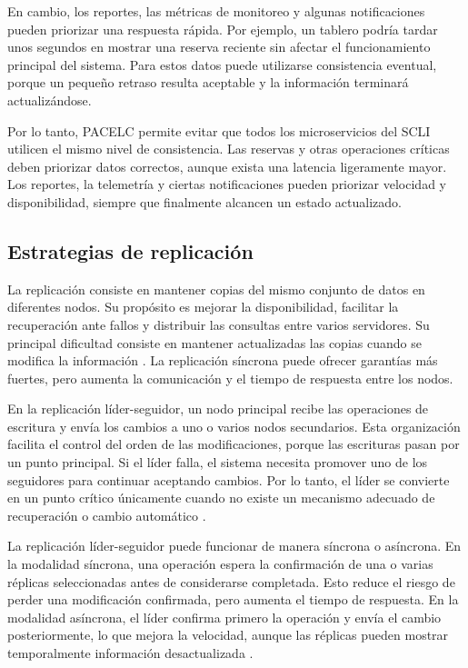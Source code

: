 \documentclass[conference]{IEEEtran}
\begin{document}
En cambio, los reportes, las métricas de monitoreo y algunas notificaciones pueden priorizar una respuesta rápida. Por ejemplo, un tablero podría tardar unos segundos en mostrar una reserva reciente sin afectar el funcionamiento principal del sistema. Para estos datos puede utilizarse consistencia eventual, porque un pequeño retraso resulta aceptable y la información terminará actualizándose.

Por lo tanto, PACELC permite evitar que todos los microservicios del SCLI utilicen el mismo nivel de consistencia. Las reservas y otras operaciones críticas deben priorizar datos correctos, aunque exista una latencia ligeramente mayor. Los reportes, la telemetría y ciertas notificaciones pueden priorizar velocidad y disponibilidad, siempre que finalmente alcancen un estado actualizado.

\subsection{Estrategias de replicación}
La replicación consiste en mantener copias del mismo conjunto de datos en diferentes nodos. Su propósito es mejorar la disponibilidad, facilitar la recuperación ante fallos y distribuir las consultas entre varios servidores. Su principal dificultad consiste en mantener actualizadas las copias cuando se modifica la información \cite{ref1}. La replicación síncrona puede ofrecer garantías más fuertes, pero aumenta la comunicación y el tiempo de respuesta entre los nodos.

En la replicación líder-seguidor, un nodo principal recibe las operaciones de escritura y envía los cambios a uno o varios nodos secundarios. Esta organización facilita el control del orden de las modificaciones, porque las escrituras pasan por un punto principal. Si el líder falla, el sistema necesita promover uno de los seguidores para continuar aceptando cambios. Por lo tanto, el líder se convierte en un punto crítico únicamente cuando no existe un mecanismo adecuado de recuperación o cambio automático \cite{ref4}.

La replicación líder-seguidor puede funcionar de manera síncrona o asíncrona. En la modalidad síncrona, una operación espera la confirmación de una o varias réplicas seleccionadas antes de considerarse completada. Esto reduce el riesgo de perder una modificación confirmada, pero aumenta el tiempo de respuesta. En la modalidad asíncrona, el líder confirma primero la operación y envía el cambio posteriormente, lo que mejora la velocidad, aunque las réplicas pueden mostrar temporalmente información desactualizada \cite{ref1}.
\end{document}
